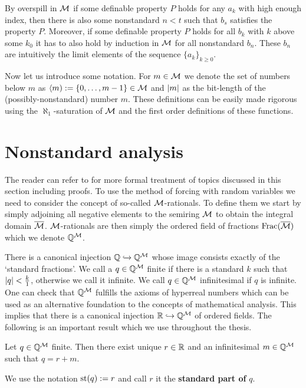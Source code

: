 By overspill in $\mathcal{M}$ if some definable property $P$ holds for any $a_k$ with high enough index, then there is also some nonstandard $n<t$ such that $b_s$ satisfies the property $P$. Moreover, if some definable property $P$ holds for all $b_k$ with $k$ above some $k_0$ it has to also hold by induction in $\mathcal{M}$ for all nonstandard $b_n$. These $b_n$ are intuitively the limit elements of the sequence $\{a_k\}_{k\geq0}$.

Now let us introduce some notation. For $m\in\mathcal{M}$ we denote the set of numbers below $m$ as $\langle m):=\{0,\dots,m-1\}\in\mathcal{M}$ and $\left|{m}\right|$ as the bit-length of the (possibly-nonstandard) number $m$. These definitions can be easily made rigorous using the $\aleph_1$-saturation of $\mathcal{M}$ and the first order definitions of these functions.

\section*{Nonstandard analysis}

The reader can refer to \cite{goldbring2014lecture} for more formal treatment of topics discussed in this section including proofs. To use the method of forcing with random variables we need to consider the concept of so-called $\mathcal{M}$-rationals. To define them we start by simply adjoining all negative elements to the semiring $\mathcal{M}$ to obtain the integral domain $\overline {\mathcal{M}}$. $\mathcal{M}$-rationals are then simply the ordered field of fractions $\text{Frac}(\overline {\mathcal{M}})$ which we denote $\mathbb{Q}^{\mathcal{M}}$.

There is a canonical injection $\mathbb{Q} \xhookrightarrow{} \mathbb{Q}^{\mathcal{M}}$ whose image consists exactly of the `standard fractions'. We call a $q\in\mathbb{Q}^{\mathcal{M}}$ finite if there is a standard $k$ such that $\left|{q}\right|<\frac{k}{1}$, otherwise we call it infinite. We call $q\in\mathbb{Q}^{\mathcal{M}}$ infinitesimal if $q$ is infinite. One can check that $\mathbb{Q}^{\mathcal{M}}$ fulfills the axioms of hyperreal numbers which can be used as an alternative foundation to the concepts of mathematical analysis. This implies that there is a canonical injection $\mathbb{R}\hookrightarrow \mathbb{Q}^{\mathcal{M}}$ of ordered fields. The following is an important result which we use throughout the thesis.

\begin{thrm*}
Let $q\in\mathbb{Q}^{\mathcal{M}}$ finite. Then there exist unique $r\in \mathbb{R}$ and an infinitesimal $m\in\mathbb{Q}^{\mathcal{M}}$ such that
$q=r+m.$

We use the notation $\text{st}(q):=r$ and call $r$ it the \textbf{standard part of} $q$.
\end{thrm*}

